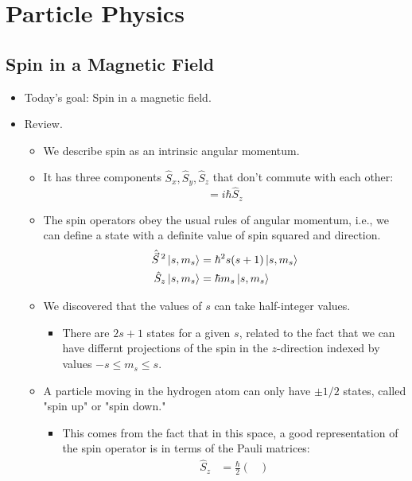 \documentclass[../notes.tex]{subfiles}
\begin{document}
\chapter{Particle Physics}
\section{Spin in a Magnetic Field}
\begin{itemize}
    \item {}Today's goal: Spin in a magnetic field.
    \item Review.
    \begin{itemize}
        \item We describe spin as an intrinsic angular momentum.
        \item It has three components $\hat{S}_x,\hat{S}_y,\hat{S}_z$ that don't commute with each other:
        \begin{equation*}
            [\hat{S}_x,\hat{S}_y] = i\hbar\hat{S}_z
        \end{equation*}
        \item The spin operators obey the usual rules of angular momentum, i.e., we can define a state with a definite value of spin squared and direction.
        \begin{align*}
            \hat{\vec{S}}{\,}^2\ket{s,m_s} &= \hbar^2s(s+1)\ket{s,m_s}\\
            \hat{S}_z\ket{s,m_s} &= \hbar m_s\ket{s,m_s}
        \end{align*}
        \item We discovered that the values of $s$ can take half-integer values.
        \begin{itemize}
            \item There are $2s+1$ states for a given $s$, related to the fact that we can have differnt projections of the spin in the $z$-direction indexed by values $-s\leq m_s\leq s$.
        \end{itemize}
        \item A particle moving in the hydrogen atom can only have $\pm 1/2$ states, called "spin up" or "spin down."
        \begin{itemize}
            \item This comes from the fact that in this space, a good representation of the spin operator is in terms of the Pauli matrices:
            \begin{align*}
                \hat{S}_z &= \frac{\hbar}{2}
                \begin{pmatrix}

\end{pmatrix}
\end{align*}
\end{itemize}
\end{itemize}
\end{itemize}
\end{document}
